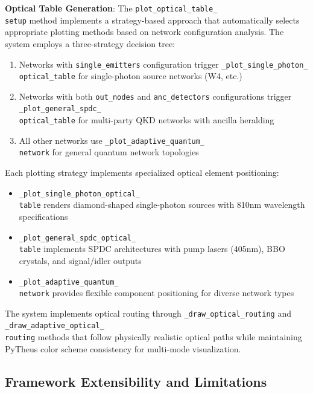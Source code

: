 \documentclass[11pt,a4paper]{article}
\begin{document}
\textbf{Optical Table Generation}: The \texttt{plot\_optical\_table\_\\setup} method implements a strategy-based approach that automatically selects appropriate plotting methods based on network configuration analysis. The system employs a three-strategy decision tree:
\begin{enumerate}
\item Networks with \texttt{single\_emitters} configuration trigger \texttt{\_plot\_single\_photon\_\\optical\_table} for single-photon source networks (W4, etc.)
\item Networks with both \texttt{out\_nodes} and \texttt{anc\_detectors} configurations trigger \texttt{\_plot\_general\_spdc\_\\optical\_table} for multi-party QKD networks with ancilla heralding
\item All other networks use \texttt{\_plot\_adaptive\_quantum\_\\network} for general quantum network topologies
\end{enumerate}

Each plotting strategy implements specialized optical element positioning:
\begin{itemize}
\item \texttt{\_plot\_single\_photon\_optical\_\\table} renders diamond-shaped single-photon sources with 810nm wavelength specifications
\item \texttt{\_plot\_general\_spdc\_optical\_\\table} implements SPDC architectures with pump lasers (405nm), BBO crystals, and signal/idler outputs
\item \texttt{\_plot\_adaptive\_quantum\_\\network} provides flexible component positioning for diverse network types
\end{itemize} The system implements optical routing through \texttt{\_draw\_optical\_routing} and \texttt{\_draw\_adaptive\_optical\_\\routing} methods that follow physically realistic optical paths while maintaining PyTheus color scheme consistency for multi-mode visualization.

\subsection{Framework Extensibility and Limitations}
\end{document}
